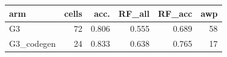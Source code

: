 \begin{tabular}{lrrrrr}
\toprule
arm & cells & acc. & RF\_all & RF\_acc & awp \\
\midrule
G3 & 72 & 0.806 & 0.555 & 0.689 & 58 \\
G3\_codegen & 24 & 0.833 & 0.638 & 0.765 & 17 \\
\bottomrule
\end{tabular}
